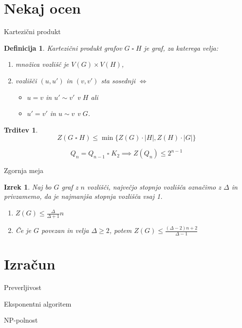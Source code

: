\documentclass{beamer}
\newtheorem{trditev}[theorem]{Trditev}
\newtheorem{izrek}[theorem]{Izrek}
\newtheorem{definicija}{Definicija}
\newcommand{\squarep}{\mathbin{\square}}
\begin{document}
\section{Nekaj ocen}
\begin{frame}{Kartezični produkt}
    \begin{definicija}
        \alert{Kartezični produkt} grafov $G \squarep H$ je graf, za katerega velja:
        \begin{enumerate}
            \item množica vozlišč je $V(G) \times V(H)$,
            \item vozlišči $(u,u')$ in $(v,v')$  sta sosednji $\iff$
            \begin{itemize}
                \item $u = v$ in $u' \sim v'$ v $H$ ali
                \item $u' = v'$ in $u \sim v$ v $G$.
            \end{itemize}
        \end{enumerate}
    \end{definicija}
    
    \begin{trditev}
        \[ Z(G \squarep H) \leq \min \{Z(G)\cdot|H|, Z(H) \cdot |G| \} \]
    \end{trditev}
    \vspace{-3mm}
    \[ Q_n = Q_{n-1} \squarep K_2 \implies Z(Q_{n}) \leq 2^{n-1} \]
\end{frame}

\begin{frame}{Zgornja meja}
    \begin{izrek}
        Naj bo $G$ graf z $n$ vozlišči, največjo stopnjo vozlišča označimo z $\Delta$ in privzamemo, da je najmanjša stopnja vozlišča vsaj 1.
        \begin{enumerate}
            \item $Z(G) \leq \frac{\Delta}{\Delta + 1} n$
            \item Če je $G$ povezan in velja $\Delta \geq 2$, potem $Z(G) \leq 
            \frac{(\Delta - 2)n + 2}{\Delta - 1}$
        \end{enumerate}
    \end{izrek}
\end{frame}

\section{Izračun}
\begin{frame}{Preverljivost}
    
\end{frame}

\begin{frame}{}
    
\end{frame}

\begin{frame}{Eksponentni algoritem}
    
\end{frame}

\begin{frame}{}
    
\end{frame}

\begin{frame}{\textsf{NP}-polnost}
    
\end{frame}
\end{document}
